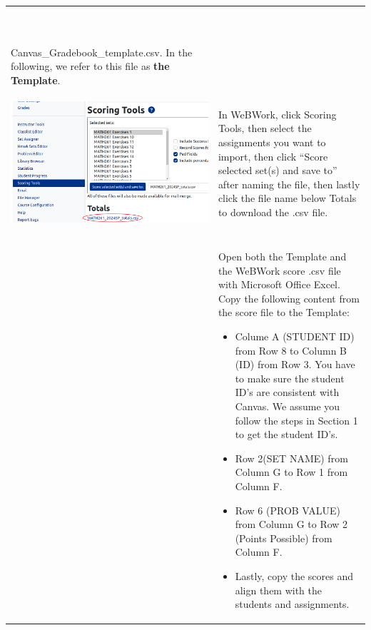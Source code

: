 \documentclass{article}
\begin{document}
{\centering
\begin{longtable}{|l|l|}
\hline
\begin{parbox}{0.45\textwidth}{\ }
\end{parbox}&\begin{parbox}{0.45\textwidth}{Download a copy of\\ Canvas\_Gradebook\_template.csv. In the following, we refer to this file as {\bf the Template}. }
\end{parbox}\\
\hline
\begin{parbox}{0.45\textwidth}{\includegraphics[width=.45\textwidth]{scoringTools.png}}
\end{parbox}&\begin{parbox}{0.45\textwidth}{In WeBWork, click Scoring Tools, then select the assignments you want to import, then click ``Score selected set(s) and save to'' after naming the file, then lastly click the file name below Totals to download the .csv file. }
\end{parbox}\\
\hline
\begin{parbox}{0.45\textwidth}{\ }
\end{parbox}&\begin{parbox}{0.45\textwidth}{Open both the Template and the WeBWork score .csv file with Microsoft Office Excel. Copy the following content from the score file to the Template:
\begin{itemize}
\item
Colume A (STUDENT ID) from Row 8 to Column B (ID) from Row 3. You have to make sure the student ID's are consistent with Canvas. We assume you follow the steps in Section 1 to get the student ID's.
\item Row 2(SET NAME) from Column G to Row 1 from Column F.
\item Row 6 (PROB VALUE) from Column G to Row 2 (Points Possible) from Column F.
\item Lastly, copy the scores and align them with the students and assignments.
\end{itemize}
}
\end{parbox}\\

\end{longtable}}
\end{document}

